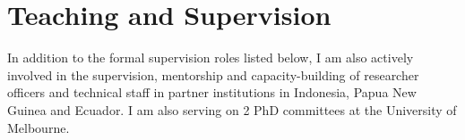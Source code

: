\documentclass[11pt,a4paper,]{awesome-cv}
\begin{document}
\begin{cventries}
{\begin{cvitems}
\end{cvitems}}
\end{cventries}

\hypertarget{teaching-and-supervision}{%
\section{Teaching and Supervision}\label{teaching-and-supervision}}

\footnotesize

In addition to the formal supervision roles listed below, I am also
actively involved in the supervision, mentorship and capacity-building
of researcher officers and technical staff in partner institutions in
Indonesia, Papua New Guinea and Ecuador. I am also serving on 2 PhD
committees at the University of Melbourne.
\end{document}
